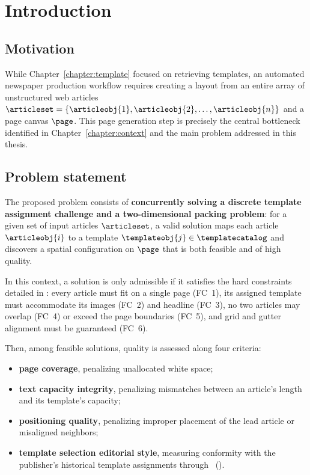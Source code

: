 
\section{Introduction}
\label{sec:pagegen-challenge}

\subsection{Motivation}

While Chapter~\ref{chapter:template} focused on retrieving templates, an automated newspaper production workflow requires creating a layout from an entire array of unstructured web articles $\articleset = \{\articleobj{1}, \articleobj{2}, \dots, \articleobj{n}\}$ and a page canvas $\page$. This page generation step is precisely the central bottleneck identified in Chapter~\ref{chapter:context} and the main problem addressed in this thesis.

\subsection{Problem statement}

The proposed problem consists of \textbf{concurrently solving a discrete template assignment challenge and a two-dimensional packing problem}: for a given set of input articles $\articleset$, a valid solution maps each article $\articleobj{i}$ to a template $\templateobj{j} \in \templatecatalog$ and discovers a spatial configuration on $\page$ that is both feasible and of high quality.

In this context, a solution is only admissible if it satisfies the hard constraints detailed in : every article must fit on a single page (FC~1), its assigned template must accommodate its images (FC~2) and headline (FC~3), no two articles may overlap (FC~4) or exceed the page boundaries (FC~5), and grid and gutter alignment must be guaranteed (FC~6).

Then, among feasible solutions, quality is assessed along four criteria:

\begin{itemize}
    \item \textbf{page coverage}, penalizing unallocated white space;
    \item \textbf{text capacity integrity}, penalizing mismatches between an article's length and its template's capacity;
    \item \textbf{positioning quality}, penalizing improper placement of the lead article or misaligned neighbors;
    \item \textbf{template selection editorial style}, measuring conformity with the publisher's historical template assignments through \neuralmethod\ ().
\end{itemize}

